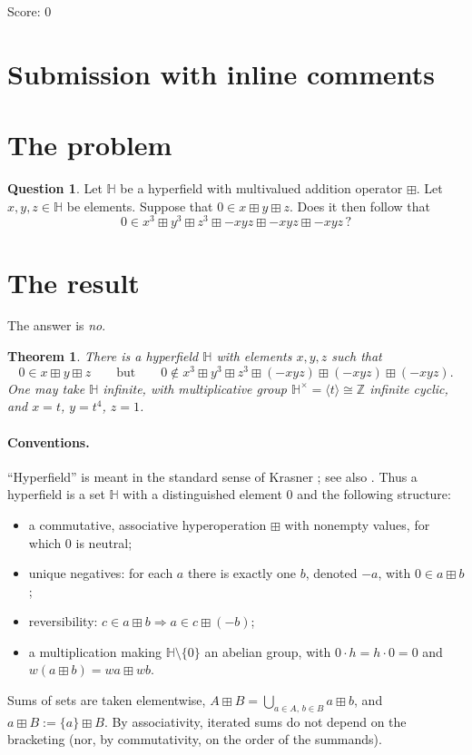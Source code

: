 \documentclass[11pt]{article}
\newtheorem{theorem}{Theorem}
\theoremstyle{definition}
\newtheorem{question}{Question}
\theoremstyle{remark}
\newcommand{\HH}{\mathbb{H}}
\newcommand{\Z}{\mathbb{Z}}
\newcommand{\bp}{\boxplus}
\begin{document}
\noindent Score: 0

\newpage
\section{Submission with inline comments}


\section{The problem}

\begin{question}\label{ques:main}
Let $\HH$ be a hyperfield with multivalued addition operator $\bp$. Let $x,y,z\in\HH$ be elements. Suppose that $0\in x\bp y\bp z$. Does it then follow that
\[
0\in x^3\bp y^3\bp z^3\bp -xyz\bp -xyz\bp -xyz\,?
\]
\end{question}

\section{The result}

The answer is \emph{no}.

\begin{theorem}\label{thm:main}
There is a hyperfield $\HH$ with elements $x,y,z$ such that
\[
0\in x\bp y\bp z
\qquad\text{but}\qquad
0\notin x^3\bp y^3\bp z^3\bp(-xyz)\bp(-xyz)\bp(-xyz).
\]
One may take $\HH$ infinite, with multiplicative group $\HH^\times=\langle t\rangle\cong\Z$ infinite cyclic, and $x=t$, $y=t^4$, $z=1$.
\end{theorem}

\paragraph{Conventions.} ``Hyperfield'' is meant in the standard sense of Krasner \cite{Kr57,Kr83}; see also \cite{Viro,BB}. Thus a hyperfield is a set $\HH$ with a distinguished element $0$ and the following structure:
\begin{itemize}[nosep]
\item a commutative, associative hyperoperation $\bp$ with nonempty values, for which $0$ is neutral;
\item unique negatives: for each $a$ there is exactly one $b$, denoted $-a$, with $0\in a\bp b$;
\item reversibility: $c\in a\bp b\Rightarrow a\in c\bp(-b)$;
\item a multiplication making $\HH\setminus\{0\}$ an abelian group, with $0\cdot h=h\cdot 0=0$ and $w(a\bp b)=wa\bp wb$.
\end{itemize}
Sums of sets are taken elementwise, $A\bp B=\bigcup_{a\in A,\,b\in B}a\bp b$, and $a\bp B:=\{a\}\bp B$. By associativity, iterated sums do not depend on the bracketing (nor, by commutativity, on the order of the summands).
\end{document}
